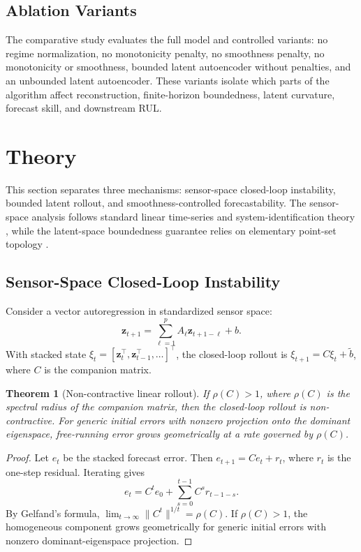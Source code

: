 \documentclass[a4paper,fleqn]{cas-sc}
\newtheorem{theorem}{Theorem}
\newcommand{\z}{\mathbf{z}}
\begin{document}
\subsection{Ablation Variants}

The comparative study evaluates the full model and controlled variants: no
regime normalization, no monotonicity penalty, no smoothness penalty, no
monotonicity or smoothness, bounded latent autoencoder without penalties, and
an unbounded latent autoencoder. These variants isolate which parts of the
algorithm affect reconstruction, finite-horizon boundedness, latent curvature,
forecast skill, and downstream RUL.

\section{Theory}
\label{sec:theory}

This section separates three mechanisms: sensor-space closed-loop instability,
bounded latent rollout, and smoothness-controlled forecastability. The sensor-space
analysis follows standard linear time-series and system-identification theory
\citep{hamilton1994time,lutkepohl2005new,ljung1999system}, while the latent-space
boundedness guarantee relies on elementary point-set topology
\citep{munkres2000topology}.

\subsection{Sensor-Space Closed-Loop Instability}

Consider a vector autoregression in standardized sensor space:
\[
    \z_{t+1}=\sum_{\ell=1}^{p}A_\ell \z_{t+1-\ell}+b .
\]
With stacked state $\xi_t=[\z_t^\top,\z_{t-1}^\top,\ldots]^\top$, the
closed-loop rollout is $\xi_{t+1}=C\xi_t+\tilde{b}$, where $C$ is the
companion matrix.

\begin{theorem}[Non-contractive linear rollout]
\label{thm:linear-growth}
If $\rho(C)>1$, where $\rho(C)$ is the spectral radius of the companion matrix,
then the closed-loop rollout is non-contractive. For generic initial errors
with nonzero projection onto the dominant eigenspace, free-running error grows
geometrically at a rate governed by $\rho(C)$.
\end{theorem}

\begin{proof}
Let $e_t$ be the stacked forecast error. Then $e_{t+1}=Ce_t+r_t$, where $r_t$
is the one-step residual. Iterating gives
\[
    e_t=C^te_0+\sum_{s=0}^{t-1}C^sr_{t-1-s}.
\]
By Gelfand's formula, $\lim_{t\to\infty}\|C^t\|^{1/t}=\rho(C)$. If
$\rho(C)>1$, the homogeneous component grows geometrically for generic initial
errors with nonzero dominant-eigenspace projection.
\end{proof}
\end{document}
